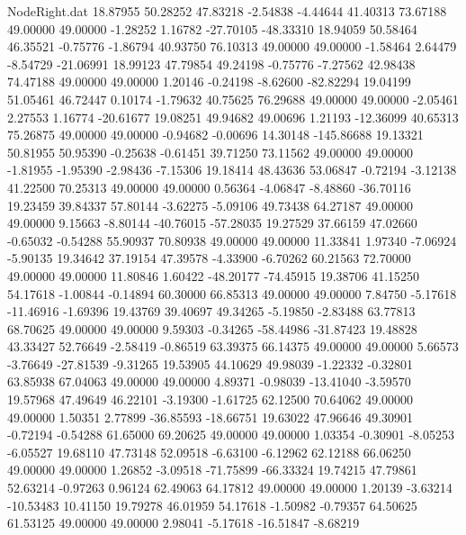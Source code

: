 \begin{filecontents}{NodeRight.dat}
  18.87955   50.28252   47.83218    -2.54838   -4.44644   41.40313   73.67188   49.00000   49.00000   -1.28252    1.16782  -27.70105  -48.33310
  18.94059   50.58464   46.35521    -0.75776   -1.86794   40.93750   76.10313   49.00000   49.00000   -1.58464    2.64479   -8.54729  -21.06991
  18.99123   47.79854   49.24198    -0.75776   -7.27562   42.98438   74.47188   49.00000   49.00000    1.20146   -0.24198   -8.62600  -82.82294
  19.04199   51.05461   46.72447     0.10174   -1.79632   40.75625   76.29688   49.00000   49.00000   -2.05461    2.27553    1.16774  -20.61677
  19.08251   49.94682   49.00696     1.21193  -12.36099   40.65313   75.26875   49.00000   49.00000   -0.94682   -0.00696   14.30148 -145.86688
  19.13321   50.81955   50.95390    -0.25638   -0.61451   39.71250   73.11562   49.00000   49.00000   -1.81955   -1.95390   -2.98436   -7.15306
  19.18414   48.43636   53.06847    -0.72194   -3.12138   41.22500   70.25313   49.00000   49.00000    0.56364   -4.06847   -8.48860  -36.70116
  19.23459   39.84337   57.80144    -3.62275   -5.09106   49.73438   64.27187   49.00000   49.00000    9.15663   -8.80144  -40.76015  -57.28035
  19.27529   37.66159   47.02660    -0.65032   -0.54288   55.90937   70.80938   49.00000   49.00000   11.33841    1.97340   -7.06924   -5.90135
  19.34642   37.19154   47.39578    -4.33900   -6.70262   60.21563   72.70000   49.00000   49.00000   11.80846    1.60422  -48.20177  -74.45915
  19.38706   41.15250   54.17618    -1.00844   -0.14894   60.30000   66.85313   49.00000   49.00000    7.84750   -5.17618  -11.46916   -1.69396
  19.43769   39.40697   49.34265    -5.19850   -2.83488   63.77813   68.70625   49.00000   49.00000    9.59303   -0.34265  -58.44986  -31.87423
  19.48828   43.33427   52.76649    -2.58419   -0.86519   63.39375   66.14375   49.00000   49.00000    5.66573   -3.76649  -27.81539   -9.31265
  19.53905   44.10629   49.98039    -1.22332   -0.32801   63.85938   67.04063   49.00000   49.00000    4.89371   -0.98039  -13.41040   -3.59570
  19.57968   47.49649   46.22101    -3.19300   -1.61725   62.12500   70.64062   49.00000   49.00000    1.50351    2.77899  -36.85593  -18.66751
  19.63022   47.96646   49.30901    -0.72194   -0.54288   61.65000   69.20625   49.00000   49.00000    1.03354   -0.30901   -8.05253   -6.05527
  19.68110   47.73148   52.09518    -6.63100   -6.12962   62.12188   66.06250   49.00000   49.00000    1.26852   -3.09518  -71.75899  -66.33324
  19.74215   47.79861   52.63214    -0.97263    0.96124   62.49063   64.17812   49.00000   49.00000    1.20139   -3.63214  -10.53483   10.41150
  19.79278   46.01959   54.17618    -1.50982   -0.79357   64.50625   61.53125   49.00000   49.00000    2.98041   -5.17618  -16.51847   -8.68219

\end{filecontents}
